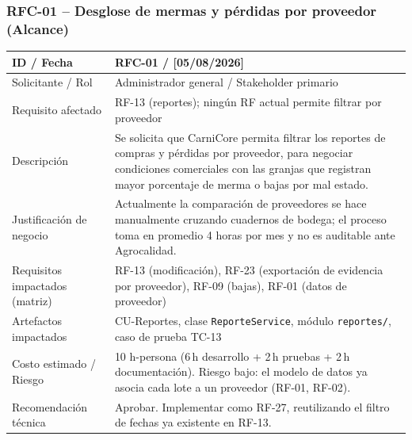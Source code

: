 \documentclass[11pt,a4paper]{article}
\begin{document}
\subsubsection*{RFC-01 -- Desglose de mermas y pérdidas por proveedor (Alcance)}
\begin{longtable}{|p{3.2cm}|p{9.8cm}|}
\hline
ID / Fecha & RFC-01 / [05/08/2026] \\
\hline
Solicitante / Rol & Administrador general / Stakeholder primario \\
\hline
Requisito afectado & RF-13 (reportes); ningún RF actual permite filtrar por proveedor \\
\hline
Descripción & Se solicita que CarniCore permita filtrar los reportes de compras y pérdidas por proveedor, para negociar condiciones comerciales con las granjas que registran mayor porcentaje de merma o bajas por mal estado. \\
\hline
Justificación de negocio & Actualmente la comparación de proveedores se hace manualmente cruzando cuadernos de bodega; el proceso toma en promedio 4 horas por mes y no es auditable ante Agrocalidad. \\
\hline
Requisitos impactados (matriz) & RF-13 (modificación), RF-23 (exportación de evidencia por proveedor), RF-09 (bajas), RF-01 (datos de proveedor) \\
\hline
Artefactos impactados & CU-Reportes, clase \texttt{ReporteService}, módulo \texttt{reportes/}, caso de prueba TC-13 \\
\hline
Costo estimado / Riesgo & 10 h-persona (6\,h desarrollo + 2\,h pruebas + 2\,h documentación). Riesgo bajo: el modelo de datos ya asocia cada lote a un proveedor (RF-01, RF-02). \\
\hline
Recomendación técnica & Aprobar. Implementar como RF-27, reutilizando el filtro de fechas ya existente en RF-13. \\
\hline
\end{longtable}
\end{document}
